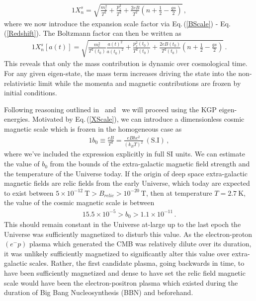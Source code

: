 \documentclass[universe,article,submit,moreauthors,pdftex,a4paper]{Definitions/mdpi}
\newcommand{\req}[1]{Eq.\,(\ref{#1})}
\begin{document}
\begin{alignat}{1}
 \label{XExplicit} X_{n}^{s} = \sqrt{\frac{m_{e}^{2}}{T^{2}}+\frac{p_{z}^{2}}{T^{2}}+\frac{2eB}{T^{2}}\left(n+\frac{1}{2}-\frac{gs}{2}\right)}\,,
\end{alignat}
where we now introduce the expansion scale factor via \req{BScale} - \req{Redshift}. The Boltzmann factor can then be written as
\begin{alignat}{1}
 \label{XScale} X_{n}^{s}[a(t)] = \sqrt{\frac{m_{e}^{2}}{T^{2}(t_{0})}\frac{a(t)^{2}}{a(t_{0})^{2}}+\frac{p_{z}^{2}(t_{0})}{T^{2}(t_{0})}+\frac{2eB(t_{0})}{T^{2}(t_{0})}\left(n+\frac{1}{2}-\frac{gs}{2}\right)}\,.
\end{alignat}
This reveals that only the mass contribution is dynamic over cosmological time. For any given eigen-state, the mass term increases driving the state into the non-relativistic limit while the momenta and magnetic contributions are frozen by initial conditions.

Following reasoning outlined in~\cite{rafelski2023study} and~\cite{Steinmetz:2018ryf} we will proceed using the KGP eigen-energies. Motivated by \req{XScale}, we can introduce a dimensionless cosmic magnetic scale which is frozen in the homogeneous case as
\begin{alignat}{1}
 \label{Bo} b_{0}\equiv\frac{eB}{T^{2}}=\frac{eB\hbar c^{2}}{(k_{B}T)^{2}}\ \mathrm{(S.I)}\,,
\end{alignat}
where we've included the expression explicitly in full SI units. We can estimate the value of $b_{0}$ from the bounds of the extra-galactic magnetic field strength and the temperature of the Universe today. If the origin of deep space extra-galactic magnetic fields are relic fields from the early Universe, which today are expected to exist between $5\times10^{-12}\ \mathrm{T}>B_{relic}>10^{-20}\ \mathrm{T}$, then at temperature $T=2.7\ \mathrm{K}$, the value of the cosmic magnetic scale is between
\begin{alignat}{1}
 \label{BoScale} 5.5\times10^{-5}>b_{0}>1.1\times10^{-11}\,.
\end{alignat}
This should remain constant in the Universe at-large up to the last epoch the Universe was sufficiently magnetized to disturb this value. As the electron-proton $(e^{-}p)$ plasma which generated the CMB was relatively dilute over its duration, it was unlikely sufficiently magnetized to significantly alter this value over extra-galactic scales. Rather, the first candidate plasma, going backwards in time, to have been sufficiently magnetized and dense to have set the relic field magnetic scale would have been the electron-positron plasma which existed during the duration of Big Bang Nucleosynthesis (BBN) and beforehand.
\end{document}
